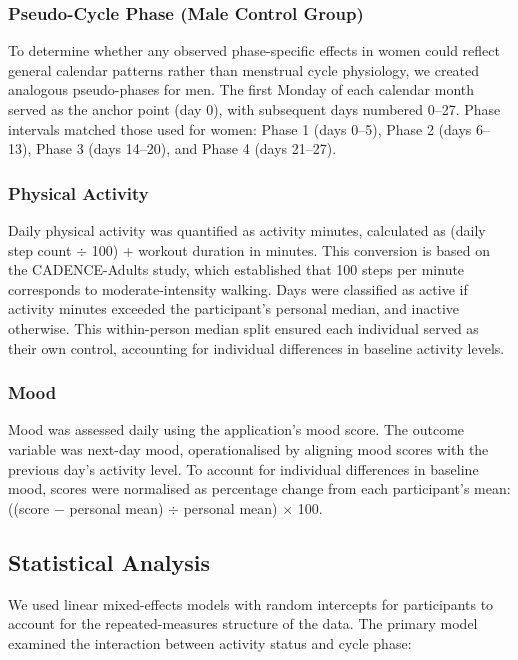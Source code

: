 \documentclass[12pt]{article}
\begin{document}
\subsubsection*{Pseudo-Cycle Phase (Male Control Group)}

To determine whether any observed phase-specific effects in women could reflect general calendar patterns rather than menstrual cycle physiology, we created analogous pseudo-phases for men. The first Monday of each calendar month served as the anchor point (day 0), with subsequent days numbered 0--27. Phase intervals matched those used for women: Phase 1 (days 0--5), Phase 2 (days 6--13), Phase 3 (days 14--20), and Phase 4 (days 21--27).

\subsubsection*{Physical Activity}

Daily physical activity was quantified as activity minutes, calculated as (daily step count $\div$ 100) + workout duration in minutes. This conversion is based on the CADENCE-Adults study, which established that 100 steps per minute corresponds to moderate-intensity walking. Days were classified as active if activity minutes exceeded the participant's personal median, and inactive otherwise. This within-person median split ensured each individual served as their own control, accounting for individual differences in baseline activity levels.

\subsubsection*{Mood}

Mood was assessed daily using the application's mood score. The outcome variable was next-day mood, operationalised by aligning mood scores with the previous day's activity level. To account for individual differences in baseline mood, scores were normalised as percentage change from each participant's mean: ((score $-$ personal mean) $\div$ personal mean) $\times$ 100.

\subsection*{Statistical Analysis}

We used linear mixed-effects models with random intercepts for participants to account for the repeated-measures structure of the data. The primary model examined the interaction between activity status and cycle phase:
\end{document}
